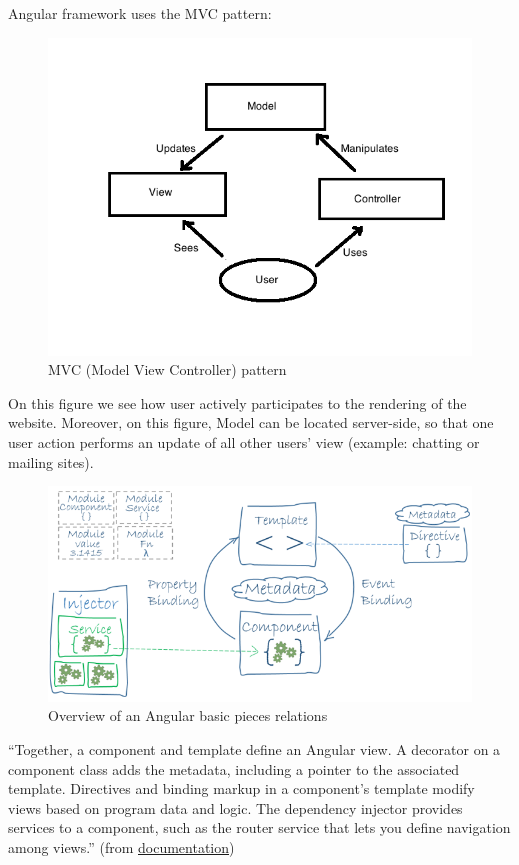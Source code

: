 \documentclass{article}
\begin{document}
                        Angular framework uses the MVC pattern:
                        \begin{figure}[H]
                            \includegraphics[width=\textwidth]{MVC.png}
                            \caption{MVC (Model View Controller) pattern}
                        \end{figure}
                        On this figure we see how user actively participates to the rendering of the website. Moreover, on this figure, Model
                        can be located server-side, so that one user action performs an update of all other users' view (example: chatting or mailing sites).\\


                        \begin{figure}[H]
                            \centering
                            \includegraphics[width=\textwidth]{overview.png}
                            \caption{Overview of an Angular basic pieces relations}
                        \end{figure}
                        ``Together, a component and template define an Angular view.
                        A decorator on a component class adds the metadata, including a pointer to the associated template.
                        Directives and binding markup in a component's template modify views based on program data and logic.
                        The dependency injector provides services to a component, such as the router service that lets you define navigation among views.''
                        (from \href{https://angular.io/guide/architecture}{documentation})
\end{document}
